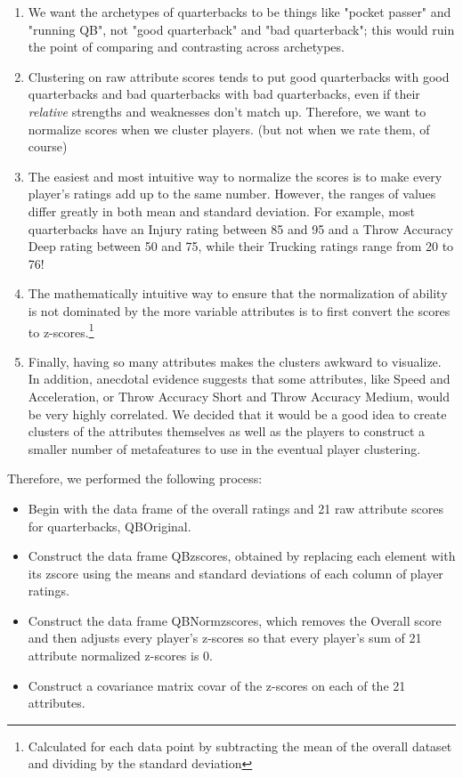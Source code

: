 \documentclass[12pt]{article}
\begin{document}
\begin{enumerate}
	\item We want the archetypes of quarterbacks to be things like "pocket passer" and "running QB", not "good quarterback" and "bad quarterback"; this would ruin the point of comparing and contrasting across archetypes.
	\item Clustering on raw attribute scores tends to put good quarterbacks with good quarterbacks and bad quarterbacks with bad quarterbacks, even if their \textit{relative} strengths and weaknesses don't match up. Therefore, we want to normalize scores when we cluster players. (but not when we rate them, of course)
	\item The easiest and most intuitive way to normalize the scores is to make every player's ratings add up to the same number. However, the ranges of values differ greatly in both mean and standard deviation. For example, most quarterbacks have an Injury rating between 85 and 95 and a Throw Accuracy Deep rating between 50 and 75, while their Trucking ratings range from 20 to 76! 
	\item The mathematically intuitive way to ensure that the normalization of ability is not dominated by the more variable attributes is to first convert the scores to z-scores.\footnote{Calculated for each data point by subtracting the mean of the overall dataset and dividing by the standard deviation}
	\item Finally, having so many attributes makes the clusters awkward to visualize. In addition, anecdotal evidence suggests that some attributes, like Speed and Acceleration, or Throw Accuracy Short and Throw Accuracy Medium, would be very highly correlated. We decided that it would be a good idea to create clusters of the attributes themselves as well as the players to construct a smaller number of metafeatures to use in the eventual player clustering.
\end{enumerate}

Therefore, we performed the following process:

\begin{itemize}
	\item Begin with the data frame of the overall ratings and 21 raw attribute scores for quarterbacks, QBOriginal.
	\item Construct the data frame QBzscores, obtained by replacing each element with its zscore using the means and standard deviations of each column of player ratings.
	\item Construct the data frame QBNormzscores, which removes the Overall score and then adjusts every player's z-scores so that every player's sum of 21 attribute normalized z-scores is 0.
	\item Construct a covariance matrix covar of the z-scores on each of the 21 attributes.
\end{itemize}
\end{document}
